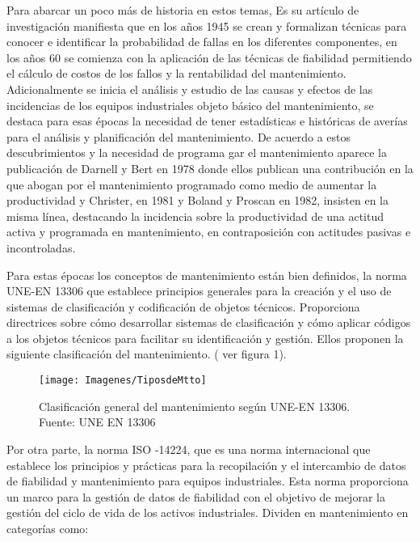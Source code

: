 \documentclass[
  11pt,
  bookmarksnumbered]{article}
\begin{document}
Para abarcar un poco más de historia en estos temas, \textcite{Carcel-Carrasco2016} Es su artículo de investigación manifiesta que en los años 1945 se crean y formalizan técnicas para conocer e identificar la probabilidad de fallas en los diferentes componentes, en los años 60 se comienza con la aplicación de las técnicas de fiabilidad permitiendo el cálculo de costos de los fallos y la rentabilidad del mantenimiento.
Adicionalmente se inicia el análisis y estudio de las causas y efectos de las incidencias de los equipos industriales objeto básico del mantenimiento, se destaca para esas épocas la necesidad de tener estadísticas e históricas de averías para el análisis y planificación del mantenimiento.
De acuerdo a estos descubrimientos y la necesidad de programa gar el mantenimiento aparece la publicación de Darnell y Bert en 1978 donde ellos publican una contribución en la que abogan por el mantenimiento programado como medio de aumentar la productividad y Christer, en 1981 y Boland y Proscan en 1982, insisten en la misma línea, destacando la incidencia sobre la productividad de una actitud activa y programada en mantenimiento, en contraposición con actitudes pasivas e incontroladas.

Para estas épocas los conceptos de mantenimiento están bien definidos, la norma UNE-EN 13306 que establece principios generales para la creación y el uso de sistemas de clasificación y codificación de objetos técnicos.
Proporciona directrices sobre cómo desarrollar sistemas de clasificación y cómo aplicar códigos a los objetos técnicos para facilitar su identificación y gestión.
Ellos proponen la siguiente clasificación del mantenimiento.
( ver figura 1).

\begin{figure}

{\centering \texttt{[image: Imagenes/TiposdeMtto]} 

}

\caption{Clasificación general del mantenimiento según UNE-EN 13306. Fuente: UNE EN 13306}\label{fig:unnamed-chunk-1}
\end{figure}

\newpage

Por otra parte, la norma ISO -14224, que es una norma internacional que establece los principios y prácticas para la recopilación y el intercambio de datos de fiabilidad y mantenimiento para equipos industriales.
Esta norma proporciona un marco para la gestión de datos de fiabilidad con el objetivo de mejorar la gestión del ciclo de vida de los activos industriales.
Dividen en mantenimiento en categorías como:
\end{document}
